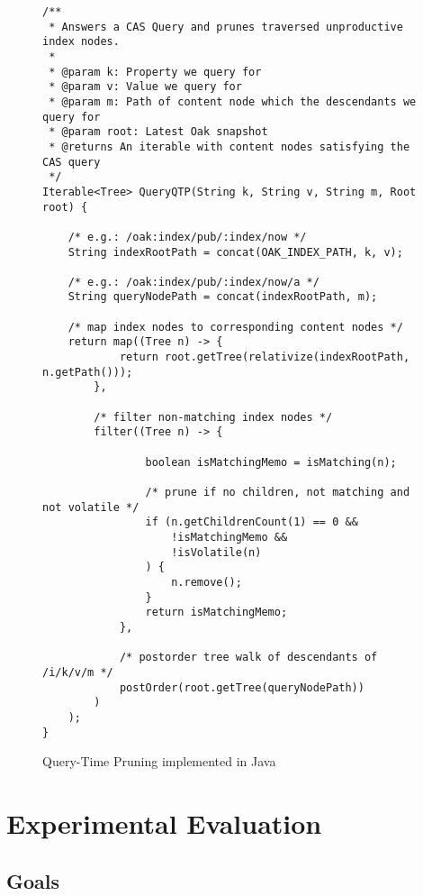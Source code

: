 \documentclass[abstracton,12pt]{scrartcl}
\theoremstyle{definition}
\begin{document}
\begin{figure}[H]
  \scriptsize
  \begin{framed}    
\begin{verbatim}
/**
 * Answers a CAS Query and prunes traversed unproductive index nodes.
 *
 * @param k: Property we query for
 * @param v: Value we query for
 * @param m: Path of content node which the descendants we query for
 * @param root: Latest Oak snapshot
 * @returns An iterable with content nodes satisfying the CAS query
 */
Iterable<Tree> QueryQTP(String k, String v, String m, Root root) {

    /* e.g.: /oak:index/pub/:index/now */
    String indexRootPath = concat(OAK_INDEX_PATH, k, v); 

    /* e.g.: /oak:index/pub/:index/now/a */
    String queryNodePath = concat(indexRootPath, m);

    /* map index nodes to corresponding content nodes */
    return map((Tree n) -> {
            return root.getTree(relativize(indexRootPath, n.getPath()));
        },

        /* filter non-matching index nodes */
        filter((Tree n) -> {
                
                boolean isMatchingMemo = isMatching(n);

                /* prune if no children, not matching and not volatile */
                if (n.getChildrenCount(1) == 0 &&
                    !isMatchingMemo &&
                    !isVolatile(n)
                ) {
                    n.remove();
                }
                return isMatchingMemo;
            },

            /* postorder tree walk of descendants of /i/k/v/m */
            postOrder(root.getTree(queryNodePath))
        )
    );
}
\end{verbatim}
  \end{framed}
  \caption[QTP implemented in Java]{Query-Time Pruning implemented in Java}
  \label{fig:java_qtp}
\end{figure}

\newpage

\section{Experimental Evaluation}
\label{sec:experimental-evaluation}

\subsection{Goals}
\end{document}
